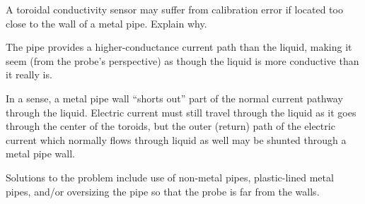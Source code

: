 

A toroidal conductivity sensor may suffer from calibration error if located too close to the wall of a metal pipe.  Explain why.







The pipe provides a higher-conductance current path than the liquid, making it seem (from the probe's perspective) as though the liquid is more conductive than it really is.

In a sense, a metal pipe wall ``shorts out'' part of the normal current pathway through the liquid.  Electric current must still travel through the liquid as it goes through the center of the toroids, but the outer (return) path of the electric current which normally flows through liquid as well may be shunted through a metal pipe wall.

\vskip 10pt

Solutions to the problem include use of non-metal pipes, plastic-lined metal pipes, and/or oversizing the pipe so that the probe is far from the walls.











